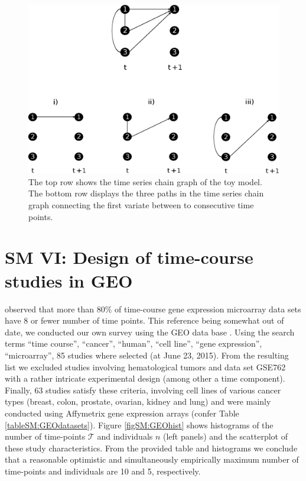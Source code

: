 \documentclass[a4paper]{article}
\begin{document}
\begin{figure}[b!]
\begin{center}
\includegraphics[angle=0, scale=0.5]{TSCG_pathExample2.eps}
\end{center}
\caption{The top row shows the time series chain graph of the toy model. The bottom row displays the three paths in the time series chain graph connecting the first variate between to consecutive time points.
\label{fig.TSCGpathAnalysis}}
\end{figure}



\newpage
\section*{SM VI: Design of time-course studies in GEO}
\cite{Ernst2005} observed that more than $80\%$ of time-course gene expression microarray data sets have 8 or fewer number of time points. This reference being somewhat out of date, we conducted our own survey using the GEO data base \cite{Edga2002}. Using the search terms ``time course'', ``cancer'', ``human'',  ``cell line'', ``gene expression'', ``microarray'', 85 studies where selected (at June 23, 2015). From the resulting list we excluded studies involving hematological tumors and data set GSE762 with a rather intricate experimental design (among other a time component). Finally, 63 studies satisfy these criteria, involving cell lines of various cancer types (breast, colon, prostate, ovarian, kidney and lung) and were mainly conducted using Affymetrix gene expression arrays (confer Table \ref{tableSM:GEOdatasets}). Figure \ref{figSM:GEOhist} shows histograms of the number of time-points $\mathcal{T}$ and individuals $n$ (left panels) and the scatterplot of these study characteristics. From the provided table and histograms we conclude that a reasonable optimistic and simultaneously empirically maximum number of time-points and individuals are 10 and 5, respectively.
\\
\mbox{ }
\\
\mbox{ }
\\
\mbox{ }
\end{document}
